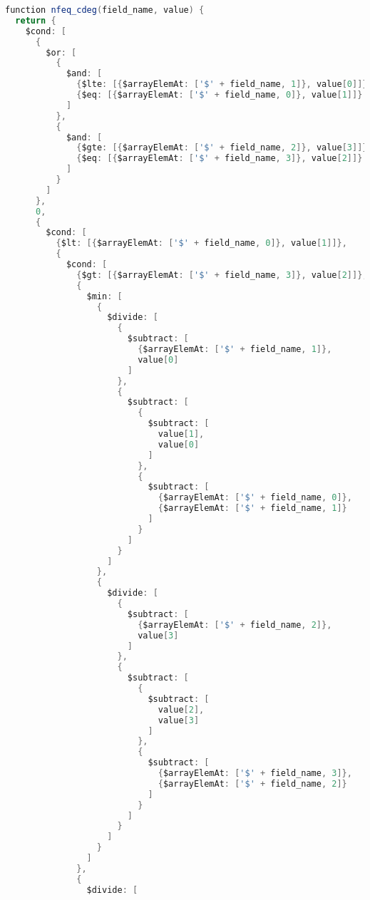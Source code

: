 \begin{lstlisting}[language=java, escapechar=|]
function nfeq_cdeg(field_name, value) {
  return {
    $cond: [
      {
        $or: [
          {
            $and: [
              {$lte: [{$arrayElemAt: ['$' + field_name, 1]}, value[0]]},
              {$eq: [{$arrayElemAt: ['$' + field_name, 0]}, value[1]]}
            ]
          },
          {
            $and: [
              {$gte: [{$arrayElemAt: ['$' + field_name, 2]}, value[3]]},
              {$eq: [{$arrayElemAt: ['$' + field_name, 3]}, value[2]]}
            ]
          }
        ]
      },
      0,
      {
        $cond: [
          {$lt: [{$arrayElemAt: ['$' + field_name, 0]}, value[1]]},
          {
            $cond: [
              {$gt: [{$arrayElemAt: ['$' + field_name, 3]}, value[2]]},
              {
                $min: [
                  {
                    $divide: [
                      {
                        $subtract: [
                          {$arrayElemAt: ['$' + field_name, 1]},
                          value[0]
                        ]
                      },
                      {
                        $subtract: [
                          {
                            $subtract: [
                              value[1],
                              value[0]
                            ]
                          },
                          {
                            $subtract: [
                              {$arrayElemAt: ['$' + field_name, 0]},
                              {$arrayElemAt: ['$' + field_name, 1]}
                            ]
                          }
                        ]
                      }
                    ]
                  },
                  {
                    $divide: [
                      {
                        $subtract: [
                          {$arrayElemAt: ['$' + field_name, 2]},
                          value[3]
                        ]
                      },
                      {
                        $subtract: [
                          {
                            $subtract: [
                              value[2],
                              value[3]
                            ]
                          },
                          {
                            $subtract: [
                              {$arrayElemAt: ['$' + field_name, 3]},
                              {$arrayElemAt: ['$' + field_name, 2]}
                            ]
                          }
                        ]
                      }
                    ]
                  }
                ]
              },
              {
                $divide: [

\end{lstlisting}
